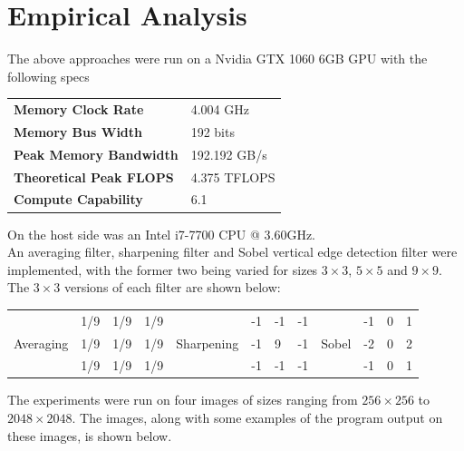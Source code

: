 \documentclass[10pt]{article}
\begin{document}
\section{Empirical Analysis}\label{EmpiricalAnalysis}
The above approaches were run on a Nvidia GTX 1060 6GB GPU with the following specs
\begin{table}[H]
\begin{tabular}{ll}
\textbf{Memory Clock Rate}     & 4.004 GHz    \\
\textbf{Memory Bus Width}      & 192 bits     \\
\textbf{Peak Memory Bandwidth} & 192.192 GB/s \\
\textbf{Theoretical Peak FLOPS} & 4.375 TFLOPS \\
\textbf{Compute Capability}    & 6.1         
\end{tabular}
\end{table}
On the host side was an Intel i7-7700 CPU @ 3.60GHz. 
\\
An averaging filter, sharpening filter and Sobel vertical edge detection filter were implemented, with the former two being varied for sizes $3\times3$, $5\times5$ and $9\times9$. The $3\times3$ versions of each filter are shown below:
\begin{table}[H]
\begin{tabular}{l|l|l|l|c|l|l|l|l|l|l|l|}
\cline{2-4} \cline{6-8} \cline{10-12}
          & 1/9 & 1/9 & 1/9 &            & -1 & -1 & -1 &       & -1 & 0 & 1 \\ \cline{2-4} \cline{6-8} \cline{10-12} 
Averaging & 1/9 & 1/9 & 1/9 & Sharpening & -1 & 9  & -1 & Sobel & -2 & 0 & 2 \\ \cline{2-4} \cline{6-8} \cline{10-12} 
          & 1/9 & 1/9 & 1/9 &            & -1 & -1 & -1 &       & -1 & 0 & 1 \\ \cline{2-4} \cline{6-8} \cline{10-12} 
\end{tabular}
\end{table}
The experiments were run on four images of sizes ranging from $256 \times 256$ to $2048 \times 2048$. The images, along with some examples of the program output on these images, is shown below.
\end{document}
